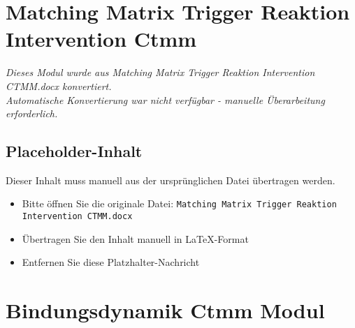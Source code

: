 


\section{Matching Matrix Trigger Reaktion Intervention Ctmm}
\label{sec:matching-matrix-trigger-reaktion-intervention-ctmm}

\begin{center}
\textit{Dieses Modul wurde aus Matching Matrix Trigger Reaktion Intervention CTMM.docx konvertiert.\\
Automatische Konvertierung war nicht verfügbar - manuelle Überarbeitung erforderlich.}
\end{center}


\subsection{Placeholder-Inhalt}

Dieser Inhalt muss manuell aus der ursprünglichen Datei übertragen werden.

\begin{itemize}
\item Bitte öffnen Sie die originale Datei: \texttt{Matching Matrix Trigger Reaktion Intervention CTMM.docx}
\item Übertragen Sie den Inhalt manuell in LaTeX-Format
\item Entfernen Sie diese Platzhalter-Nachricht
\end{itemize}




\section{Bindungsdynamik Ctmm Modul}
\label{sec:bindungsdynamik-ctmm-modul}

